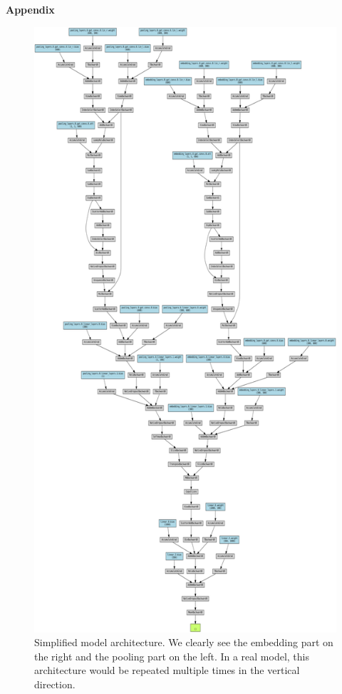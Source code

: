 \documentclass[switch, 11pt]{article}
\begin{document}
\newpage
\appendix

\vspace{5mm}
\begin{center}
    {\Large \bfseries Appendix} \\
\end{center}
\begin{figure}[H]
    \centering
    \includegraphics[width=0.85\columnwidth]{figures/architecture.png}
    \caption{Simplified model architecture. We clearly see the embedding part on the right and the pooling part on the left. In a real model, this architecture would be repeated multiple times in the vertical direction.}
    \label{fig:architecture}
\end{figure}
\end{document}
